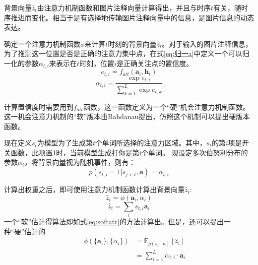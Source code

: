 背景向量$\hat{z}_t$由注意力机制函数和图片注释向量计算得出，并且与时序$t$有关，随时序推进而变化。相当于是有选择地传输图片注释向量中的信息，是图片信息的动态表达。

确定一个注意力机制函数$\phi$来计算$t$时刻的背景向量$\hat{z}_t$。对于输入的图片注释信息，为了推测这一位置是否是正确的注意力集中点，在式\eqref{eq:归一a}中定义一个可以归一化的参数$\alpha_{t,i}$来表示在$t$时刻，位置$i$是正确关注点的置信度。
\begin{equation}
    e_{t,i}=f_{att}(\textbf{a}_i,\textbf{h}_t)
\end{equation}
\begin{equation}
    \label{eq:归一a}
    \alpha_{t,i}=\frac{\exp e_{t,i}}{\sum_{k=1}^{L}\exp e_{t,k}}
\end{equation}

计算置信度时需要用到$f_{att}$函数，这一函数定义为一个“硬”机会注意力机制函数。
这一机会注意力机制的“软”版本由Bahdanau提出，仿照这个机制可以提出硬版本函数。

现在定义$s_t$为模型为了生成第$t$个单词所选择的注意力区域。其中，$s_t$的第$i$项是开关函数，此项置1时，当前模型生成打你是第i个单词。
现设定多次伯努利分布的参数${\alpha_i}$，将背景向量视为随机事件，则有：
\begin{equation}
    p(s_{t,i} = 1|s_{j<t}, \textbf{a}) = \alpha_{t,i}
\end{equation}

计算出权重之后，即可使用注意力机制函数计算出背景向量$\hat{z}_t$:
\begin{equation}
    \label{eq:bgvector}
    \hat{z}_t=\phi(\textbf{a}_i,\alpha_i)
\end{equation}
\begin{equation}
    \hat{z}_t = \sum_i s_{t,i}\textbf{a}_i
\end{equation}
一个“软”估计得算法即如式\eqref{eq:softatt}的方法计算出。但是，还可以提出一种“硬”估计的
\begin{equation}
    \begin{aligned}
        &&\phi(\{\textbf{a}_i\},\{\alpha_i\})&= \mathbb{E}_{p(s_t\mid a)} [\hat{z}_t] \\
        && & =\sum_{i=1}^L \alpha_{t,i} \cdot \textbf{a}_i \\
    \end{aligned}
    \label{eq:softatt}
\end{equation}

